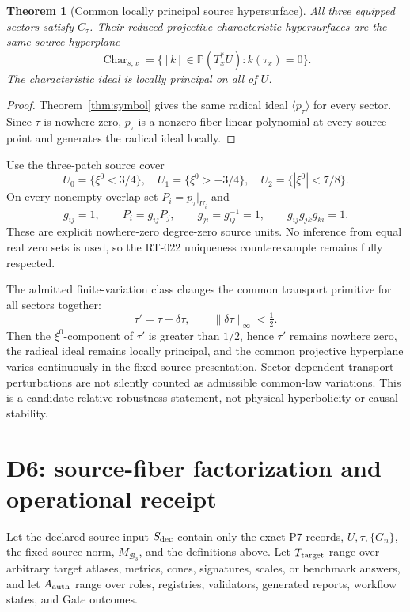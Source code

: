 \documentclass[11pt]{article}
\newtheorem{theorem}{Theorem}
\newcommand{\Bthree}{\mathcal B_3}
\newcommand{\Char}{\operatorname{Char}}
\begin{document}
\begin{theorem}[Common locally principal source hypersurface]
\label{thm:common}
All three equipped sectors satisfy \(C_\tau\). Their reduced projective
characteristic hypersurfaces are the same source hyperplane
\[
 \Char_{s,x}
 =
 \{[k]\in\mathbb P(T_x^*U):k(\tau_x)=0\}.
\]
The characteristic ideal is locally principal on all of \(U\).
\end{theorem}

\begin{proof}
Theorem~\ref{thm:symbol} gives the same radical ideal
\(\langle p_\tau\rangle\) for every sector. Since \(\tau\) is nowhere zero,
\(p_\tau\) is a nonzero fiber-linear polynomial at every source point and
generates the radical ideal locally.
\end{proof}

Use the three-patch source cover
\[
 U_0=\{\xi^0<3/4\},\quad
 U_1=\{\xi^0>-3/4\},\quad
 U_2=\{|\xi^0|<7/8\}.
\]
On every nonempty overlap set \(P_i=p_\tau|_{U_i}\) and
\[
 g_{ij}=1,\qquad
 P_i=g_{ij}P_j,\qquad
 g_{ji}=g_{ij}^{-1}=1,\qquad
 g_{ij}g_{jk}g_{ki}=1.
\]
These are explicit nowhere-zero degree-zero source units. No inference from
equal real zero sets is used, so the RT-022 uniqueness counterexample remains
fully respected.

The admitted finite-variation class changes the common transport primitive
for all sectors together:
\[
 \tau'=\tau+\delta\tau,\qquad
 \|\delta\tau\|_{\infty}<\tfrac12.
\]
Then the \(\xi^0\)-component of \(\tau'\) is greater than \(1/2\), hence
\(\tau'\) remains nowhere zero, the radical ideal remains locally principal,
and the common projective hyperplane varies continuously in the fixed source
presentation. Sector-dependent transport perturbations are not silently
counted as admissible common-law variations. This is a candidate-relative
robustness statement, not physical hyperbolicity or causal stability.

\section{D6: source-fiber factorization and operational receipt}

Let the declared source input \(S_{\rm dec}\) contain only the exact P7
records, \(U,\tau,\{G_n\}\), the fixed source norm, \(M_{\Bthree}\), and the
definitions above. Let \(T_{\rm target}\) range over arbitrary target atlases,
metrics, cones, signatures, scales, or benchmark answers, and let
\(A_{\rm auth}\) range over roles, registries, validators, generated reports,
workflow states, and Gate outcomes.
\end{document}
